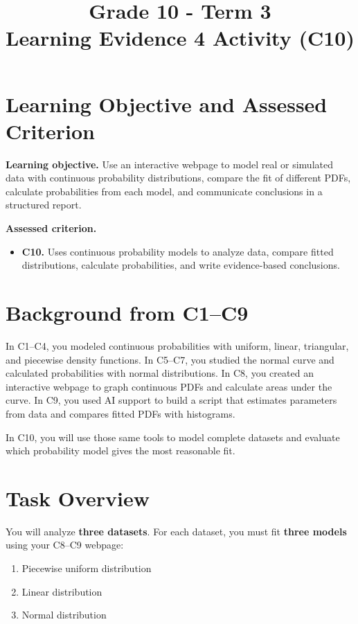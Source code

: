 \makeatletter
{}
\makeatother



\title{Grade 10 - Term 3 \\ Learning Evidence 4 Activity (C10)}
\author{}
\date{}


	\maketitle
	
	\section*{Learning Objective and Assessed Criterion}
	\textbf{Learning objective.} Use an interactive webpage to model real or simulated data with continuous probability distributions, compare the fit of different PDFs, calculate probabilities from each model, and communicate conclusions in a structured report.
	
	\vspace{0.2cm}
	\textbf{Assessed criterion.}
	\begin{itemize}
		\item \textbf{C10.} Uses continuous probability models to analyze data, compare fitted distributions, calculate probabilities, and write evidence-based conclusions.
	\end{itemize}

	\section{Background from C1--C9}
	In C1--C4, you modeled continuous probabilities with uniform, linear, triangular, and piecewise density functions. In C5--C7, you studied the normal curve and calculated probabilities with normal distributions. In C8, you created an interactive webpage to graph continuous PDFs and calculate areas under the curve. In C9, you used AI support to build a script that estimates parameters from data and compares fitted PDFs with histograms.
	
	In C10, you will use those same tools to model complete datasets and evaluate which probability model gives the most reasonable fit.

	\section{Task Overview}
	You will analyze \textbf{three datasets}. For each dataset, you must fit \textbf{three models} using your C8--C9 webpage:
	\begin{enumerate}
		\item Piecewise uniform distribution
		\item Linear distribution
		\item Normal distribution
	\end{enumerate}
	
